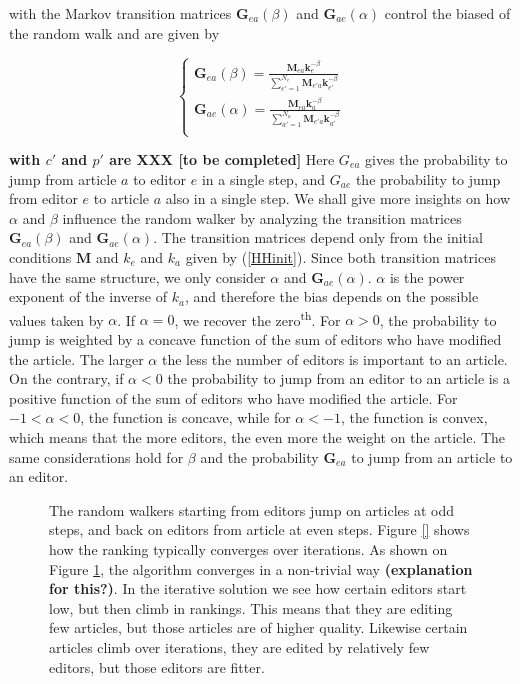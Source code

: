 with the Markov transition matrices $\mathbf{G}_{ea}(\beta)$ and $\mathbf{G}_{ae}(\alpha)$ control the biased of the random walk and are given by 

\begin{equation}
\begin{cases}
\mathbf{G}_{ea}(\beta) = \frac{\mathbf{M}_{ea} \mathbf{k}_{e}^{-\beta}}{\sum_{e' = 1}^{N_e} \mathbf{M}_{e'a} \mathbf{k}_{e'}^{-\beta}}\\
\mathbf{G}_{ae}(\alpha) = \frac{\mathbf{M}_{ea} \mathbf{k}_{a}^{-\beta}}{\sum_{a' = 1}^{N_a} \mathbf{M}_{e'a} \mathbf{k}_{a'}^{-\beta}}\\
 \end{cases}
\end{equation}

{\bf with $c'$ and $p'$ are XXX [to be completed]} Here $G_{ea}$ gives the probability to jump from article $a$ to editor $e$ in a single step, and $G_{ae}$ the probability to jump from editor $e$ to article $a$ also in a single step. We shall give more insights on how $\alpha$ and $\beta$ influence the random walker by analyzing the transition matrices $\mathbf{G}_{ea}(\beta)$ and $\mathbf{G}_{ae}(\alpha)$. The transition matrices depend only from the initial conditions $\mathbf{M}$ and $k_e$ and $k_a$ given by (\ref{HHinit}). Since both transition matrices have the same structure, we only consider $\alpha$  and $\mathbf{G}_{ae}(\alpha)$. $\alpha$ is the power exponent of the inverse of $k_a$, and therefore the bias depends on the possible values taken by $\alpha$. If $\alpha = 0$, we recover the zero\textsuperscript{th}. For $\alpha > 0$, the probability to jump is weighted by a concave function of the sum of editors who have modified the article. The larger $\alpha$ the less the number of editors is important to an article. On the contrary, if $\alpha < 0$ the probability to jump from an editor to an article is a positive function of the sum of editors who have modified the article. For $-1 < \alpha < 0$, the function is concave, while for $\alpha < -1$, the function is convex, which means that the more editors, the even more the weight on the article. The same considerations hold for $\beta$ and the probability $\mathbf{G}_{ea}$ to jump from an article to an editor. 


\begin{figure}[!t]
\centering
\caption{The random walkers starting from editors jump on articles at odd steps, and back on editors from article at even steps. Figure \ref{} shows how the ranking typically converges over iterations. As shown on Figure \ref{fig:convergence}, the algorithm converges in a non-trivial way {\bf (explanation for this?)}. In the iterative solution we see how certain editors start low, but then climb in rankings. This means that they are editing few articles, but those articles are of higher quality. Likewise certain articles climb over iterations, they are edited by relatively few editors, but those editors are fitter.
}
\label{fig:convergence}
\end{figure}

